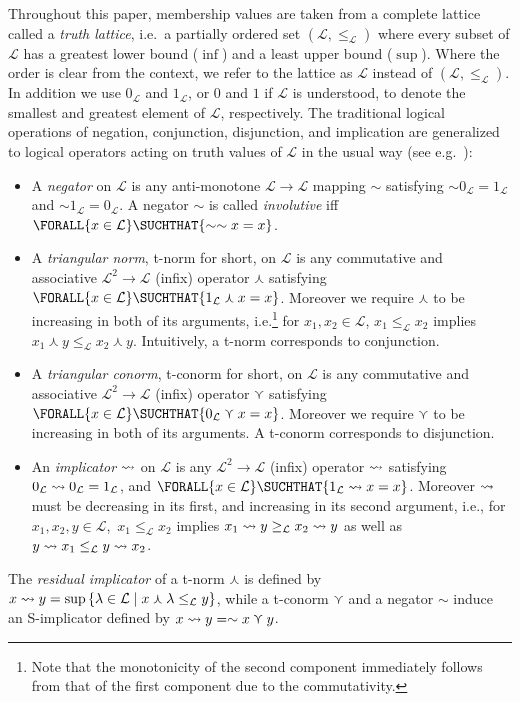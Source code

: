 \documentclass[12pt,a4paper]{article}
\newcommand{\Forall}[2]{\ensuremath{\FORALL{#1} \SUCHTHAT {#2}}}
\newcommand{\mc}[1]{\ensuremath{\mathcal{#1}}}
\newcommand{\Lattice}{\ensuremath{\mc{L}}}
\newcommand{\fand}{\ensuremath{\curlywedge}}
\newcommand{\for}{\ensuremath{\curlyvee}}
\newcommand{\fneg}{\ensuremath{\sim}}
\begin{document}
Throughout this paper, membership values are taken from a complete lattice called a  \emph{truth lattice}, i.e.~a partially
ordered set $(\Lattice, \leq_\Lattice)$ where every subset of
\Lattice{} has a greatest lower bound ($\inf$) and a least upper bound
($\sup$)\cite{birkhoff:1967}. Where the order is clear from the context, we 
refer to the lattice as $\Lattice$ instead of $(\Lattice, \leq_\Lattice)$. In addition we use $0_\Lattice$ and $1_\Lattice$,
or $0$ and $1$ if \Lattice{} is understood,
to denote the smallest and greatest element of \Lattice{},
respectively. 
The traditional logical operations of negation, conjunction, disjunction, and implication
are generalized to logical operators acting on
truth values of \Lattice{} in the usual way (see e.g.~\cite{novak:1999}):
\begin{itemize}
\item A \emph{negator} on \Lattice{} is any anti-monotone $\Lattice \to \Lattice$
mapping \fneg{} satisfying
$\fneg 0_\Lattice = 1_\Lattice$ and $\fneg 1_\Lattice = 0_\Lattice$. 
A negator
\fneg{} is called \emph{involutive} iff \Forall{x\in\Lattice}{\fneg \fneg x = x}.
\item
A \emph{triangular norm}, t-norm for short, on $\Lattice$ is any
commutative and associative $\Lattice^2 \to \Lattice$ (infix) operator $\fand$ satisfying
\Forall{x\in\Lattice}{1_\Lattice \fand x = x}. Moreover we require $\fand$ to be
increasing in both of its arguments, i.e.\footnote{Note that the
monotonicity of the second component immediately follows from that of the
first component due to the commutativity.} for $x_1, x_2 \in \Lattice$,
$x_1 \leq_{\Lattice} x_2$ implies $x_1 \fand y \leq_{\Lattice} x_2 \fand y$.
Intuitively, a t-norm corresponds to conjunction.
\item
A \emph{triangular conorm}, t-conorm for short, on $\Lattice$ is any
commutative and associative $\Lattice^2 \to \Lattice$
(infix) operator $\for$ satisfying \Forall{x\in\Lattice}{0_\Lattice \for x = x}.
Moreover we require $\for$ to be increasing in both of its arguments. 
A t-conorm corresponds to disjunction.
\item
An \emph{implicator} $\rightsquigarrow$ on $\Lattice$ is any $\Lattice^2 \to \Lattice$ (infix) operator
$\rightsquigarrow$ satisfying $\fimplies{0_\Lattice}{0_\Lattice} = 1_\Lattice$, and 
\Forall{x\in\Lattice}{\fimplies{1_\Lattice}{x} =  x}.
Moreover $\rightsquigarrow$ must be decreasing in its first, and
increasing in its second argument, i.e., for $x_1,x_2,y\in\Lattice$,~$x_1 \leq_{\Lattice} x_2$
implies $\fimplies{x_1}{y} \geq_{\Lattice} \fimplies{x_2}{y}$ as well as 
$\fimplies{y}{x_1} \leq_{\Lattice} \fimplies{y}{x_2}$.
\end{itemize}
The \emph{residual implicator} of a t-norm $\fand$ is defined by 
$\fimplies{x}{y} = \sup\set{\lambda\in\Lattice{}\mid x\fand \lambda
  \leq_\Lattice{} y}$,
while a t-conorm $\for$ and a negator $\fneg$ induce an S-implicator defined by 
$\fimplies{x}{y} = \fneg x \curlyvee y$.
\end{document}
